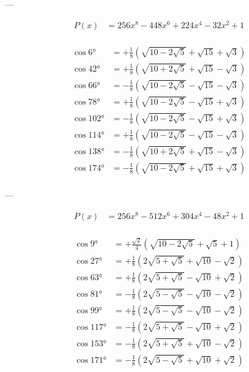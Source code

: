 ---

$$
\begin{aligned}
    P(x) &= 256 x^8-448 x^6+224 x^4-32 x^2+1\\
\end{aligned}
$$

$$
\begin{aligned}
    \cos 6°   &= +\frac{1}{8} \left(\sqrt{10-2\sqrt{5}}+\sqrt{15}+\sqrt{3}\right)\\
    \cos 42°  &= +\frac{1}{8} \left(\sqrt{10+2\sqrt{5}}+\sqrt{15}-\sqrt{3}\right)\\
    \cos 66°  &= -\frac{1}{8} \left(\sqrt{10-2\sqrt{5}}-\sqrt{15}-\sqrt{3}\right)\\
    \cos 78°  &= +\frac{1}{8} \left(\sqrt{10-2\sqrt{5}}-\sqrt{15}+\sqrt{3}\right)\\
    \cos 102° &= -\frac{1}{8} \left(\sqrt{10-2\sqrt{5}}-\sqrt{15}+\sqrt{3}\right)\\
    \cos 114° &= +\frac{1}{8} \left(\sqrt{10-2\sqrt{5}}-\sqrt{15}-\sqrt{3}\right)\\
    \cos 138° &= -\frac{1}{8} \left(\sqrt{10+2\sqrt{5}}+\sqrt{15}-\sqrt{3}\right)\\
    \cos 174° &= -\frac{1}{8} \left(\sqrt{10-2\sqrt{5}}+\sqrt{15}+\sqrt{3}\right)\\
\end{aligned}
$$

---

$$
\begin{aligned}
    P(x) &= 256 x^8-512 x^6+304 x^4-48 x^2+1\\
\end{aligned}
$$

$$
\begin{aligned}
    \cos 9°   &= +\frac{\sqrt{2}}{4} \left(\sqrt{10-2\sqrt{5}}+\sqrt{5}+1\right)\\
    \cos 27°  &= +\frac{1}{8} \left(2\sqrt{5+\sqrt{5}}+\sqrt{10}-\sqrt{2}\right)\\
    \cos 63°  &= +\frac{1}{8} \left(2\sqrt{5+\sqrt{5}}-\sqrt{10}+\sqrt{2}\right)\\
    \cos 81°  &= -\frac{1}{8} \left(2\sqrt{5-\sqrt{5}}-\sqrt{10}-\sqrt{2}\right)\\
    \cos 99°  &= +\frac{1}{8} \left(2\sqrt{5-\sqrt{5}}-\sqrt{10}-\sqrt{2}\right)\\
    \cos 117° &= -\frac{1}{8} \left(2\sqrt{5+\sqrt{5}}-\sqrt{10}+\sqrt{2}\right)\\
    \cos 153° &= -\frac{1}{8} \left(2\sqrt{5+\sqrt{5}}+\sqrt{10}-\sqrt{2}\right)\\
    \cos 171° &= -\frac{1}{8} \left(2\sqrt{5-\sqrt{5}}+\sqrt{10}+\sqrt{2}\right)\\
\end{aligned}
$$

